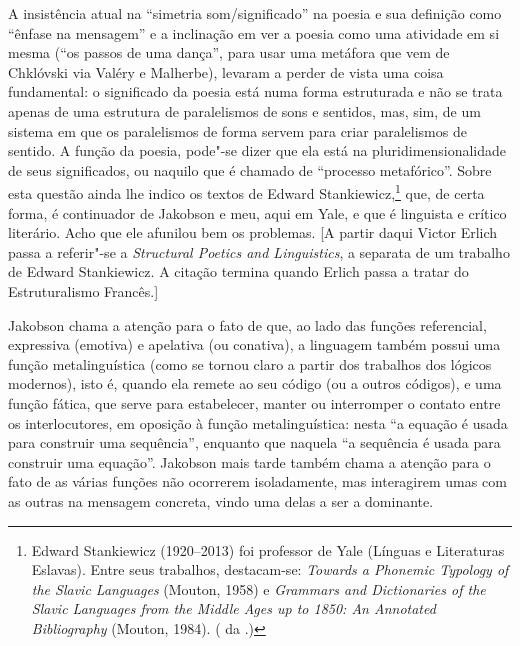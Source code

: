 A insistência atual na ``simetria som/significado'' na poesia e sua
definição como ``ênfase na mensagem'' e a inclinação em ver a poesia
como uma atividade em si mesma (``os passos de uma dança'', para usar
uma metáfora que vem de Chklóvski via Valéry e Malherbe), levaram a
perder de vista uma coisa fundamental: o significado da poesia está numa
forma estruturada e não se trata apenas de uma estrutura de paralelismos
de sons e sentidos, mas, sim, de um sistema em que os paralelismos de
forma servem para criar paralelismos de sentido. A função da poesia,
pode"-se dizer que ela está na pluridimensionalidade de seus significados, ou
naquilo que é chamado de ``processo metafórico''.
Sobre esta questão ainda lhe indico os textos de Edward Stankiewicz,\footnote{Edward
 Stankiewicz (1920--2013) foi professor de Yale (Línguas e Literaturas
 Eslavas). Entre seus trabalhos, destacam-se: \emph{Towards a 
Phonemic Typology of the Slavic Languages} (Mouton, 1958) e 
\emph{Grammars and Dictionaries of the Slavic Languages from the 
Middle Ages up to 1850: An Annotated Bibliography} (Mouton, 1984).
 ( da .)} que,
de certa forma, é continuador de Jakobson e meu, aqui em Yale, e que é
linguista e crítico literário. Acho que ele afunilou bem os problemas.
 [A partir daqui Victor Erlich passa a referir"-se a
 \emph{Structural Poetics and Linguistics}, a separata de um
 trabalho de Edward Stankiewicz. A citação termina quando Erlich passa
 a tratar do Estruturalismo Francês.]

Jakobson chama a atenção para o fato de que, ao lado das funções
referencial, expressiva (emotiva) e apelativa (ou conativa), a linguagem
também possui uma função metalinguística (como se tornou claro a partir
dos trabalhos dos lógicos modernos), isto é, quando ela remete ao seu
código (ou a outros códigos), e uma função fática, que serve para
estabelecer, manter ou interromper o contato entre os interlocutores, em
oposição à função metalinguística: nesta ``a equação é usada para
construir uma sequência'', enquanto que naquela ``a sequência é usada
para construir uma equação''. Jakobson mais tarde também chama a atenção para o
fato de as várias funções não ocorrerem isoladamente, mas interagirem
umas com as outras na mensagem concreta, vindo uma delas a ser a
dominante.

